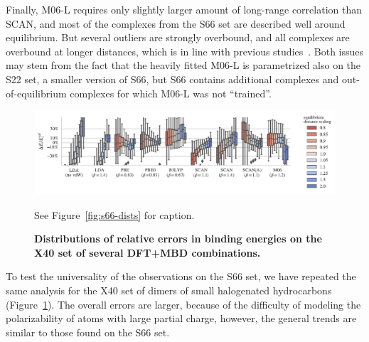 Finally, M06-L requires only slightly larger amount of long-range correlation than SCAN, and most of the complexes from the S66 set are described well around equilibrium.
But several outliers are strongly overbound, and all complexes are overbound at longer distances, which is in line with previous studies~\cite{GoerigkJPCL15}.
Both issues may stem from the fact that the heavily fitted M06-L is parametrized also on the S22 set, a smaller version of S66, but S66 contains additional complexes and out-of-equilibrium complexes for which M06-L was not ``trained''.

\begin{figure}
\includegraphics[center,width=0.95\linewidth]{media/x40-dists}
\caption{\textbf{Distributions of relative errors in binding energies on the X40 set of several DFT+MBD combinations.}
}\label{fig:x40-dists}
See Figure~\ref{fig:s66-dists} for caption.
\end{figure}

To test the universality of the observations on the S66 set, we have repeated the same analysis for the X40 set of dimers of small halogenated hydrocarbons (Figure~\ref{fig:x40-dists}).
The overall errors are larger, because of the difficulty of modeling the polarizability of atoms with large partial charge, however, the general trends are similar to those found on the S66 set.

